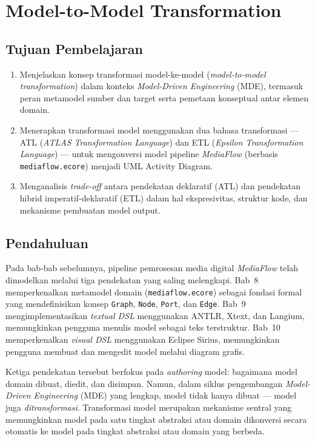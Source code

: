\chapter{Model-to-Model Transformation}
\label{chap:m2m-transformation}

\section*{Tujuan Pembelajaran}
\begin{enumerate}
  \item Menjelaskan konsep transformasi model-ke-model (\textit{model-to-model transformation}) dalam konteks \textit{Model-Driven Engineering} (MDE), termasuk peran metamodel sumber dan target serta pemetaan konseptual antar elemen domain.
  \item Menerapkan transformasi model menggunakan dua bahasa transformasi --- ATL (\textit{ATLAS Transformation Language}) dan ETL (\textit{Epsilon Transformation Language}) --- untuk mengonversi model pipeline \textit{MediaFlow} (berbasis \texttt{mediaflow.ecore}) menjadi UML Activity Diagram.
  \item Menganalisis \textit{trade-off} antara pendekatan deklaratif (ATL) dan pendekatan hibrid imperatif-deklaratif (ETL) dalam hal ekspresivitas, struktur kode, dan mekanisme pembuatan model output.
\end{enumerate}

\section{Pendahuluan}

Pada bab-bab sebelumnya, pipeline pemrosesan media digital \textit{MediaFlow} telah dimodelkan melalui tiga pendekatan yang saling melengkapi. Bab~8 memperkenalkan metamodel domain (\texttt{mediaflow.ecore}) sebagai fondasi formal yang mendefinisikan konsep \texttt{Graph}, \texttt{Node}, \texttt{Port}, dan \texttt{Edge}. Bab~9 mengimplementasikan \textit{textual DSL} menggunakan ANTLR, Xtext, dan Langium, memungkinkan pengguna menulis model sebagai teks terstruktur. Bab~10 memperkenalkan \textit{visual DSL} menggunakan Eclipse Sirius, memungkinkan pengguna membuat dan mengedit model melalui diagram grafis.

Ketiga pendekatan tersebut berfokus pada \textit{authoring} model: bagaimana model domain dibuat, diedit, dan disimpan. Namun, dalam siklus pengembangan \textit{Model-Driven Engineering} (MDE) yang lengkap, model tidak hanya dibuat --- model juga \textit{ditransformasi}. Transformasi model merupakan mekanisme sentral yang memungkinkan model pada satu tingkat abstraksi atau domain dikonversi secara otomatis ke model pada tingkat abstraksi atau domain yang berbeda.

